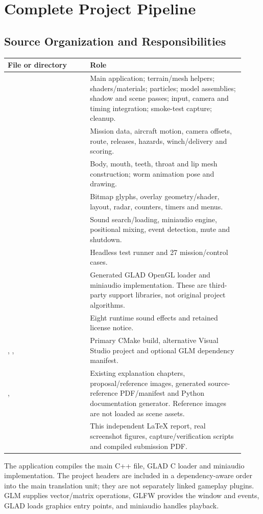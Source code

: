 \clearpage
\section{Complete Project Pipeline}
\subsection{Source Organization and Responsibilities}
\begin{longtable}{L{0.32\linewidth}L{0.60\linewidth}}
\toprule\textbf{File or directory}&\textbf{Role}\\\midrule\endhead
{} & Main application; terrain/mesh helpers; shaders/materials; particles; model assemblies; shadow and scene passes; input, camera and timing integration; smoke-test capture; cleanup.\\
 & Mission data, aircraft motion, camera offsets, route, releases, hazards, winch/delivery and scoring.\\
 & Body, mouth, teeth, throat and lip mesh construction; worm animation pose and drawing.\\
 & Bitmap glyphs, overlay geometry/shader, layout, radar, counters, timers and menus.\\
 & Sound search/loading, miniaudio engine, positional mixing, event detection, mute and shutdown.\\
 & Headless test runner and 27 mission/control cases.\\
 & Generated GLAD OpenGL loader and miniaudio implementation. These are third-party support libraries, not original project algorithms.\\
 & Eight runtime sound effects and retained license notice.\\
, ,  & Primary CMake build, alternative Visual Studio project and optional GLM dependency manifest.\\
,  & Existing explanation chapters, proposal/reference images, generated source-reference PDF/manifest and Python documentation generator. Reference images are not loaded as scene assets.\\
 & This independent LaTeX report, real screenshot figures, capture/verification scripts and compiled submission PDF.\\
\bottomrule
\end{longtable}
The application compiles the main C++ file, GLAD C loader and miniaudio implementation. The project headers are included in a dependency-aware order into the main translation unit; they are not separately linked gameplay plugins. GLM supplies vector/matrix operations, GLFW provides the window and events, GLAD loads graphics entry points, and miniaudio handles playback.

